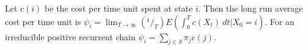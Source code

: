  Let $c(i)$ be the cost per time unit spent at state $i$. Then the long run average cost per time unit is 
$\psi_i = \lim_{T \to \infty} (^1/_T) E(\int^T_0 c(X_t)\ dt | X_0 = i)$.
 For an irreducible positive recurrent chain $\psi_i = \sum_{j \in S} \pi_j c(j).$